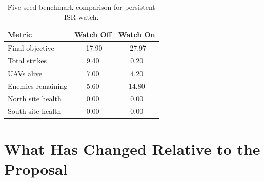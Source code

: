 \documentclass[conference]{IEEEtran}
\begin{document}
\begin{table}[t]
    \centering
    \caption{Five-seed benchmark comparison for persistent ISR watch.}
    \label{tab:watch_results}
    \begin{tabular}{lcc}
        \toprule
        Metric & Watch Off & Watch On \\
        \midrule
        Final objective & -17.90 & -27.97 \\
        Total strikes & 9.40 & 0.20 \\
        UAVs alive & 7.00 & 4.20 \\
        Enemies remaining & 5.60 & 14.80 \\
        North site health & 0.00 & 0.00 \\
        South site health & 0.00 & 0.00 \\
        \bottomrule
    \end{tabular}
\end{table}

\section{What Has Changed Relative to the Proposal}
\end{document}
